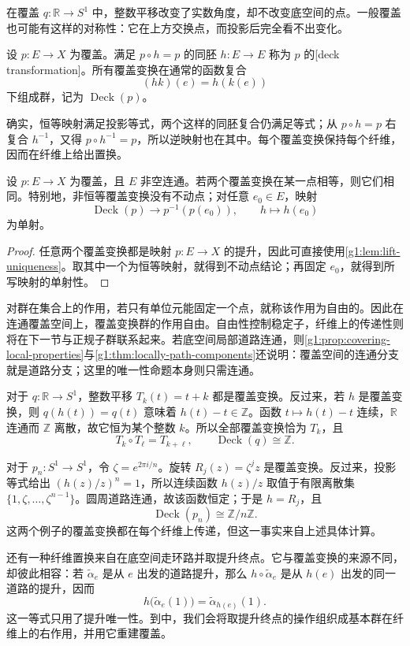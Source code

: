 在覆盖 \(q:\mathbb R\to S^1\) 中，整数平移改变了实数角度，却不改变底空间的点。一般覆盖也可能有这样的对称性：它在上方交换点，而投影后完全看不出变化。

\begin{definition}\label{g1:def:deck-transformation}
	设 \(p:E\to X\) 为覆盖。满足 \(p\circ h=p\) 的同胚 \(h:E\to E\) 称为 \(p\) 的[deck transformation]。所有覆盖变换在通常的函数复合
	\[
		(hk)(e)=h(k(e))
	\]
	下组成群，记为 \(\operatorname{Deck}(p)\)。
\end{definition}

确实，恒等映射满足投影等式，两个这样的同胚复合仍满足等式；从 \(p\circ h=p\) 右复合 \(h^{-1}\)，又得 \(p\circ h^{-1}=p\)，所以逆映射也在其中。每个覆盖变换保持每个纤维，因而在纤维上给出置换。

\begin{proposition}\label{g1:prop:deck-determined}
	设 \(p:E\to X\) 为覆盖，且 \(E\) 非空连通。若两个覆盖变换在某一点相等，则它们相同。特别地，非恒等覆盖变换没有不动点；对任意 \(e_0\in E\)，映射
	\[
		\operatorname{Deck}(p)\longrightarrow p^{-1}(p(e_0)),
		\qquad h\longmapsto h(e_0)
	\]
	为单射。
\end{proposition}
\begin{proof}
	任意两个覆盖变换都是映射 \(p:E\to X\) 的提升，因此可直接使用\cref{g1:lem:lift-uniqueness}。取其中一个为恒等映射，就得到不动点结论；再固定 \(e_0\)，就得到所写映射的单射性。
\end{proof}

对群在集合上的作用，若只有单位元能固定一个点，就称该作用为自由的。因此在连通覆盖空间上，覆盖变换群的作用自由。自由性控制稳定子，纤维上的传递性则将在下一节与正规子群联系起来。若底空间局部道路连通，则\cref{g1:prop:covering-local-properties}与\cref{g1:thm:locally-path-components}还说明：覆盖空间的连通分支就是道路分支；这里的唯一性命题本身则只需连通。

\begin{example}\label{g1:exm:circle-deck-groups}
	对于 \(q:\mathbb R\to S^1\)，整数平移 \(T_k(t)=t+k\) 都是覆盖变换。反过来，若 \(h\) 是覆盖变换，则 \(q(h(t))=q(t)\) 意味着 \(h(t)-t\in\mathbb Z\)。函数 \(t\mapsto h(t)-t\) 连续，\(\mathbb R\) 连通而 \(\mathbb Z\) 离散，故它恒为某个整数 \(k\)。所以全部覆盖变换恰为 \(T_k\)，且
	\[
		T_k\circ T_\ell=T_{k+\ell},\qquad \operatorname{Deck}(q)\cong\mathbb Z.
	\]

	对于 \(p_n:S^1\to S^1\)，令 \(\zeta=e^{2\pi i/n}\)。旋转 \(R_j(z)=\zeta^jz\) 是覆盖变换。反过来，投影等式给出 \((h(z)/z)^n=1\)，所以连续函数 \(h(z)/z\) 取值于有限离散集 \(\{1,\zeta,\ldots,\zeta^{n-1}\}\)。圆周道路连通，故该函数恒定；于是 \(h=R_j\)，且
	\[
		\operatorname{Deck}(p_n)\cong\mathbb Z/n\mathbb Z.
	\]
	这两个例子的覆盖变换都在每个纤维上传递，但这一事实来自上述具体计算。
\end{example}

还有一种纤维置换来自在底空间走环路并取提升终点。它与覆盖变换的来源不同，却彼此相容：若 \(\widetilde\alpha_e\) 是从 \(e\) 出发的道路提升，那么 \(h\circ\widetilde\alpha_e\) 是从 \(h(e)\) 出发的同一道路的提升，因而
\[
	h\bigl(\widetilde\alpha_e(1)\bigr)
	=\widetilde\alpha_{h(e)}(1).
\]
这一等式只用了提升唯一性。到中，我们会将取提升终点的操作组织成基本群在纤维上的右作用，并用它重建覆盖。
